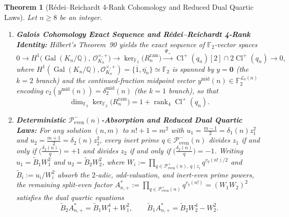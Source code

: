 \documentclass[11pt,reqno]{amsart}
\newtheorem{theorem}{Theorem}[section]
\theoremstyle{remark}
\numberwithin{equation}{section}
\newcommand{\Q}{\mathbb{Q}}
\newcommand{\F}{\mathbb{F}}
\newcommand{\Peven}{\mathcal{P}_{\mathrm{even}}}
\DeclareMathOperator{\Gal}{Gal}
\DeclareMathOperator{\Cl}{Cl}
\DeclareMathOperator{\rank}{rank}
\begin{document}
\begin{theorem}[{R\'edei--Reichardt 4-Rank Cohomology and Reduced Dual Quartic Laws}]\label{thm:5.3}
Let $n \ge 8$ be an integer.
\begin{enumerate}
\item[(i)] \textbf{Galois Cohomology Exact Sequence and R\'edei--Reichardt 4-Rank Identity:} Hilbert's Theorem~90 yields the exact sequence of $\F_2$-vector spaces
\begin{equation}\label{eq:5.8}
0 \longrightarrow H^1\bigl(\Gal(K_n/\Q),\, \mathcal{O}_{K_n}^{\times,+}\bigr) \longrightarrow \ker_{\F_2}\bigl(R_n^{\mathrm{ram}}\bigr) \xrightarrow{\;\Psi_+\;} \Cl^+(q_n)[2] \cap 2\Cl^+(q_n) \longrightarrow 0,
\end{equation}
where $H^1(\Gal(K_n/\Q), \mathcal{O}_{K_n}^{\times,+}) = \{\overline{1}, \overline{\eta_n}\} \simeq \F_2$ is spanned by $y = \mathbf{0}$ (the $k = 2$ branch) and the continued-fraction midpoint vector $y^{\mathrm{mid}}(n) \in \F_2^{\mathcal{L}_0(n)}$ encoding $c_2(y^{\mathrm{mid}}(n)) = \delta_2^{\mathrm{mid}}(n)$ (the $k = 1$ branch), so that
\begin{equation}\label{eq:5.9}
\dim_{\F_2} \ker_{\F_2}\bigl(R_n^{\mathrm{ram}}\bigr) = 1 + \rank_4 \Cl^+(q_n).
\end{equation}
\item[(ii)] \textbf{Deterministic $\Peven^-(n)$-Absorption and Reduced Dual Quartic Laws:} For any solution $(n, m)$ to $n! + 1 = m^2$ with $u_1 = \frac{m-1}{2} = \delta_1(n)z_1^2$ and $u_2 = \frac{m+1}{2} = \delta_2(n)z_2^2$, every inert prime $q \in \Peven^-(n)$ divides $z_1$ if and only if $\bigl(\frac{\delta_2(n)}{q}\bigr) = +1$ and divides $z_2$ if and only if $\bigl(\frac{\delta_2(n)}{q}\bigr) = -1$. Writing $u_1 = \widetilde{B}_1 W_1^2$ and $u_2 = \widetilde{B}_2 W_2^2$, where $W_i := \prod_{q \in \Peven^+(n),\, q \mid z_i} q^{v_q(n!)/2}$ and $\widetilde{B}_i := u_i / W_i^2$ absorb the $2$-adic, odd-valuation, and inert-even prime powers, the remaining split-even factor $A_{n,+}^* := \prod_{q \in \Peven^+(n)} q^{v_q(n!)} = (W_1 W_2)^2$ satisfies the dual quartic equations
\begin{equation}\label{eq:5.10}
\widetilde{B}_2 A_{n,+}^* = \widetilde{B}_1 W_1^4 + W_1^2, \qquad \widetilde{B}_1 A_{n,+}^* = \widetilde{B}_2 W_2^4 - W_2^2.
\end{equation}
\end{enumerate}
\end{theorem}
\end{document}
